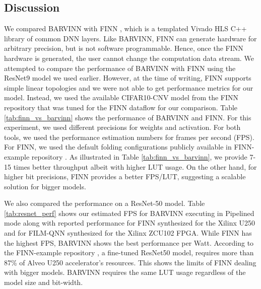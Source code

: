 \documentclass[sigconf]{acmart}
\newcommand{\barvinn}{BARVINN}
\newcommand{\BARVINN}{BARVINN}
\begin{document}
\subsection{ Discussion  }

We compared \BARVINN{} with FINN \cite{umuroglu2017finn}, which is a templated Vivado HLS C++ library of common DNN layers. Like \BARVINN{}, FINN can generate hardware for arbitrary precision, but is not software programmable. Hence, once the FINN hardware is generated, the user cannot change the computation data stream. We attempted to compare the performance of \BARVINN{} with FINN using the ResNet9 model we used earlier. However, at the time of writing, FINN supports simple linear topologies and we were not able to get performance metrics for our model. Instead, we used the available CIFAR10-CNV model from the FINN repository that was tuned for the FINN dataflow for our comparison. Table \ref{tab:finn_vs_barvinn} shows the performance of \BARVINN{} and FINN. For this experiment, we used different precisions for weights and activation. For both tools, we used the performance estimation numbers for frames per second (FPS). For FINN, we used the default folding configurations publicly available in FINN-example repository \cite{finn-example}. As illustrated in Table \ref{tab:finn_vs_barvinn}, we provide 7-15 times better throughput
albeit with higher LUT usage. On the other hand, for higher bit precisions, FINN provides a better FPS/LUT, suggesting a scalable solution for bigger models. 

We also compared the performance on a ResNet-50 model. Table \ref{tab:resnet_perf} shows our estimated FPS for \BARVINN{} executing in Pipelined mode along with reported performance for FINN \cite{finn-example} synthesized for the Xilinx U250 and for FILM-QNN \cite{sun2022film} synthesized for the Xilinx ZCU102 FPGA. While FINN has the highest FPS, \BARVINN{} shows the best performance per Watt.
According to the FINN-example repository \cite{finn-example}, a fine-tuned ResNet50 model, requires more than 87\% of Alveo U250 accelerator's resources. This shows the limits of FINN dealing with bigger models. \BARVINN{} requires the same LUT usage regardless of the model size and bit-width. 

\end{document}
